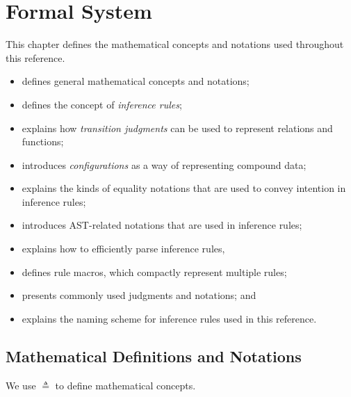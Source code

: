 \chapter{Formal System \label{chap:FormalSystem}}

This chapter defines the mathematical concepts and notations used throughout this
reference.

\ChapterOutline
\begin{itemize}
  \item {} defines general mathematical concepts and notations;
  \item {} defines the concept of \emph{inference rules};
  \item {} explains how \emph{transition judgments} can be used to represent
        relations and functions;
  \item {} introduces \emph{configurations} as a way of representing compound data;
  \item {} explains the kinds of equality notations that are used to
        convey intention in inference rules;
  \item {} introduces AST-related notations that are used in inference rules;
  \item {} explains how to efficiently parse inference rules,
  \item {} defines rule macros, which compactly represent multiple rules;
  \item {} presents commonly used judgments and notations; and
  \item {} explains the naming scheme for inference rules used in this reference.
\end{itemize}

\section{Mathematical Definitions and Notations\label{sec:Mathematical Definitions and Notations}}
\hypertarget{def-triangleq}{}
We use $\triangleq$ to define mathematical concepts.

